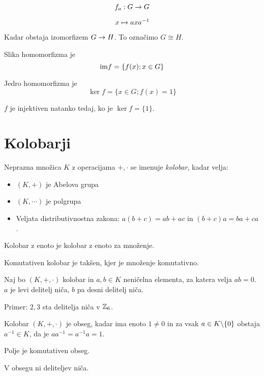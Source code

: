 
\[
	f_a : G \to G
\]

\[
	x \mapsto a x a^{-1}
\]


Kadar obstaja izomorfizem $G \to H$. To označimo $G \cong H$.


Slika homomorfizma je \[
	\text{im} f = \{f(x); x \in G\}
\]

Jedro homomorfizma je \[
	\ker f = \{x \in G; f(x) = 1\}
\]


$f$ je injektiven natanko tedaj, ko je $\ker f = \{1\}$.

\section{Kolobarji}


Neprazna množica $K$ z operacijama $+, \cdot$ se imenuje \textit{kolobar}, kadar velja:
\begin{itemize}
	\item $(K, +)$ je Abelova grupa
	\item $(K, \cdots)$ je polgrupa
	\item Veljata distributivnostna zakona: $a(b+c) = ab+ac$ in $(b+c)a = ba + ca$.
\end{itemize}


Kolobar z enoto je kolobar z enoto za množenje.

Komutativen kolobar je takšen, kjer je množenje komutativno.


Naj bo $(K, +, \cdot)$ kolobar in $a, b \in K$ neničelna elementa, za katera velja $ab = 0$. $a$ je levi delitelj niča, $b$ pa desni delitelj niča.

Primer: $2, 3$ sta delitelja niča v $\mathbb{Z}_6$.


Kolobar $(K, +, \cdot)$ je obseg, kadar ima enoto $1 \ne 0$ in za vsak $a \in K \backslash \{0\}$ obstaja $a^{-1} \in K$, da je $aa^{-1} = a^{-1}a = 1$.

Polje je komutativen obseg.

V obsegu ni deliteljev niča.